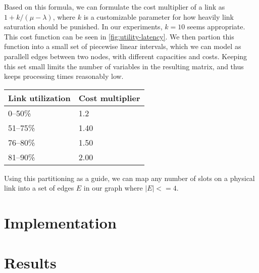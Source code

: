 
Based on this formula, we can formulate the cost multiplier of a link as $1 + k/(\mu - \lambda)$, where $k$ is a customizable parameter for how heavily link saturation should be punished. In our experiments, $k=10$ seems appropriate. This cost function can be seen in \autoref{fig:utility-latency}. We then partion this function into a small set of piecewise linear intervals, which we can model as parallell edges between two nodes, with different capacities and costs. Keeping this set small limits the number of variables in the resulting matrix, and thus keeps processing times reasonably low.



\begin{center}
    \label{tab:utilization-to-cost}
    \begin{tabular}{| l | l |}
    \hline
    \textbf{Link utilization} & \textbf{Cost multiplier} \\ \hline
    0--50\% & 1.2 \\ \hline
    51--75\% & 1.40 \\ \hline
    76--80\% & 1.50 \\ \hline
    81--90\% & 2.00 \\ \hline
    \end{tabular}
\end{center}

Using this partitioning as a guide, we can map any number of slots on a physical link into a set of edges $E$ in our graph where $|E| <= 4$.




\section{Implementation}\label{sec:implementation}



\section{Results}

